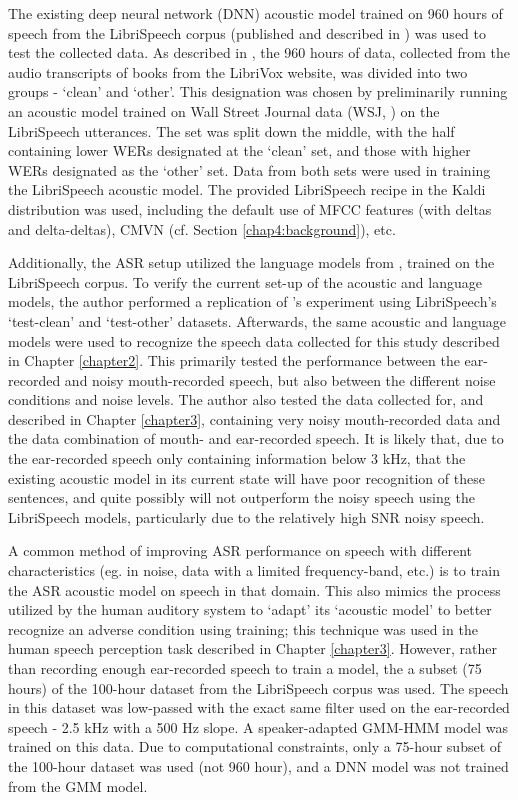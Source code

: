 The existing deep neural network (DNN) acoustic model trained on 960 hours of speech from the LibriSpeech corpus (published and described in \cite{panayotov:15}) was used to test the collected data.  As described in \cite{panayotov:15}, the 960 hours of data, collected from the audio transcripts of books from the LibriVox website, was divided into two groups - `clean' and `other'.  This designation was chosen by preliminarily running an acoustic model trained on Wall Street Journal data (WSJ, \cite{paul:92}) on the LibriSpeech utterances. The set was split down the middle, with the half containing lower WERs designated at the `clean' set, and those with higher WERs designated as the `other' set.  Data from both sets were used in training the LibriSpeech acoustic model.  The provided LibriSpeech recipe in the Kaldi distribution was used, including the default use of MFCC features (with deltas and delta-deltas), CMVN (cf. Section \ref{chap4:background}), etc.

Additionally, the ASR setup utilized the language models from \cite{panayotov:15}, trained on the LibriSpeech corpus.  To verify the current set-up of the acoustic and language models, the author performed a replication of \cite{panayotov:15}'s experiment using LibriSpeech's `test-clean' and `test-other' datasets.  Afterwards, the same acoustic and language models were used to recognize the speech data collected for this study described in Chapter \ref{chapter2}. This primarily tested the performance between the ear-recorded and noisy mouth-recorded speech, but also between the different noise conditions and noise levels.  The author also tested the data collected for, and described in Chapter \ref{chapter3}, containing very noisy mouth-recorded data and the data combination of mouth- and ear-recorded speech.
It is likely that, due to the ear-recorded speech only containing information below 3 kHz, that the existing acoustic model in its current state will have poor recognition of these sentences, and quite possibly will not outperform the noisy speech using the LibriSpeech models, particularly due to the relatively high SNR noisy speech.

A common method of improving ASR performance on speech with different characteristics (eg. in noise, data with a limited frequency-band, etc.) is to train the ASR acoustic model on speech in that domain.  This also mimics the process utilized by the human auditory system to `adapt' its `acoustic model' to better recognize an adverse condition using training; this technique was used in the human speech perception task described in Chapter \ref{chapter3}.  However, rather than recording enough ear-recorded speech to train a model, the a subset (75 hours) of the 100-hour dataset from the LibriSpeech corpus was used.  The speech in this dataset was low-passed with the exact same filter used on the ear-recorded speech - 2.5 kHz with a 500 Hz slope.  A speaker-adapted GMM-HMM model was trained on this data.  Due to computational constraints, only a 75-hour subset of the 100-hour dataset was used (not 960 hour), and a DNN model was not trained from the GMM model.

